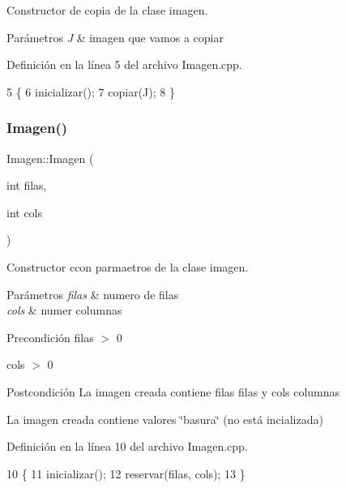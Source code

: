Constructor de copia de la clase imagen. 


\begin{DoxyParams}{Parámetros}
{\em J} & imagen que vamos a copiar \\
\hline
\end{DoxyParams}


Definición en la línea 5 del archivo Imagen.\+cpp.


\begin{DoxyCode}
5                               \{
6   inicializar();
7   copiar(J);
8 \}
\end{DoxyCode}
\mbox{\label{classImagen_ad4943ff0e2de31d4c25a879030f3ebf2}} 
\subsubsection{\texorpdfstring{Imagen()}{Imagen()}\hspace{0.1cm}{\footnotesize\ttfamily [2/2]}}
{\footnotesize\ttfamily Imagen\+::\+Imagen (\begin{DoxyParamCaption}\item[{int}]{filas,  }\item[{int}]{cols }\end{DoxyParamCaption})}



Constructor ccon parmaetros de la clase imagen. 


\begin{DoxyParams}{Parámetros}
{\em filas} & numero de filas \\
\hline
{\em cols} & numer columnas \\
\hline
\end{DoxyParams}
\begin{DoxyPrecond}{Precondición}
filas $>$ 0 

cols $>$ 0 
\end{DoxyPrecond}
\begin{DoxyPostcond}{Postcondición}
La imagen creada contiene filas filas y cols columnas 

La imagen creada contiene valores \char`\"{}basura\char`\"{} (no está incializada) 
\end{DoxyPostcond}


Definición en la línea 10 del archivo Imagen.\+cpp.


\begin{DoxyCode}
10                                   \{
11   inicializar();
12   reservar(filas, cols);
13 \}
\end{DoxyCode}
\mbox{\label{classImagen_a03dd93c9cf920a9dc0b72f8bd34f2e8a}} 
